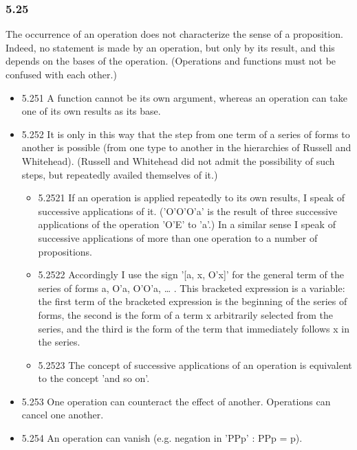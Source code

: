 \documentclass[11pt]{article}
\begin{document}
\subsubsection*{5.25}
\label{sec:org09dd1fb}
The occurrence of an operation does not characterize the sense of a
proposition. Indeed, no statement is made by an operation, but only by its
result, and this depends on the bases of the operation. (Operations and
functions must not be confused with each other.)
\begin{itemize}
\item 5.251
\label{sec:org5df33ee}
A function cannot be its own argument, whereas an operation can take
one of its own results as its base.
\item 5.252
\label{sec:orgaaec182}
It is only in this way that the step from one term of a series of
forms to another is possible (from one type to another in the hierarchies
of Russell and Whitehead). (Russell and Whitehead did not admit the
possibility of such steps, but repeatedly availed themselves of it.)
\begin{itemize}
\item 5.2521
\label{sec:org4a961ed}
If an operation is applied repeatedly to its own results, I speak of
successive applications of it. ('O'O'O'a' is the result of three successive
applications of the operation 'O'E' to 'a'.) In a similar sense I speak of
successive applications of more than one operation to a number of
propositions.
\item 5.2522
\label{sec:org7d7db36}
Accordingly I use the sign '[a, x, O'x]' for the general term of the
series of forms a, O'a, O'O'a, \ldots{} . This bracketed expression is a
variable: the first term of the bracketed expression is the beginning of
the series of forms, the second is the form of a term x arbitrarily
selected from the series, and the third is the form of the term that
immediately follows x in the series.
\item 5.2523
\label{sec:org8fdba79}
The concept of successive applications of an operation is equivalent
to the concept 'and so on'.
\end{itemize}
\item 5.253
\label{sec:org8de0657}
One operation can counteract the effect of another. Operations can
cancel one another.
\item 5.254
\label{sec:orgae133ca}
An operation can vanish (e.g. negation in 'PPp' : PPp = p).
\end{itemize}
\end{document}
